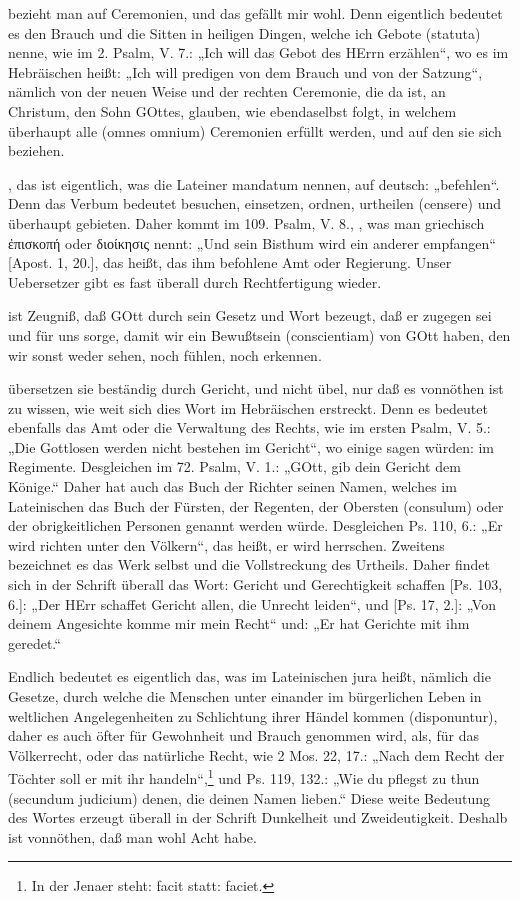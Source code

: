  bezieht man auf Ceremonien, und das gefällt mir wohl. Denn eigentlich bedeutet es den Brauch und die Sitten in heiligen Dingen, welche ich Gebote (statuta) nenne, wie im 2. Psalm, V. 7.: „Ich will das Gebot des HErrn erzählen“, wo es im Hebräischen heißt: „Ich will predigen von dem Brauch und von der Satzung“, nämlich von der neuen Weise und der rechten Ceremonie, die da ist, an Christum, den Sohn GOttes, glauben, wie ebendaselbst folgt, in welchem überhaupt alle (omnes omnium) Ceremonien erfüllt werden, und auf den sie sich beziehen.

, das ist eigentlich, was die Lateiner mandatum nennen, auf deutsch: „befehlen“. Denn das Verbum  bedeutet besuchen, einsetzen, ordnen, urtheilen (censere) und überhaupt gebieten. Daher kommt im 109. Psalm, V. 8., , was man griechisch ἐπισκοπή oder διοίκησις nennt: „Und sein Bisthum wird ein anderer empfangen“ [Apost. 1, 20.], das heißt, das ihm befohlene Amt oder Regierung. Unser Uebersetzer gibt es fast überall durch Rechtfertigung wieder.

 ist Zeugniß, daß GOtt durch sein Gesetz und Wort bezeugt, daß er zugegen sei und für uns sorge, damit wir ein Bewußtsein (conscientiam) von GOtt haben, den wir sonst weder sehen, noch fühlen, noch erkennen.

 übersetzen sie beständig durch Gericht, und nicht übel, nur daß es vonnöthen ist zu wissen, wie weit sich dies Wort im Hebräischen erstreckt. Denn es bedeutet ebenfalls das Amt oder die Verwaltung des Rechts, wie im ersten Psalm, V. 5.: „Die Gottlosen werden nicht bestehen im Gericht“, wo einige sagen würden: im Regimente. Desgleichen im 72. Psalm, V. 1.: „GOtt, gib dein Gericht dem Könige.“ Daher hat auch das Buch der Richter seinen Namen, welches im Lateinischen das Buch der Fürsten, der Regenten, der Obersten (consulum) oder der obrigkeitlichen Personen genannt werden würde. Desgleichen Ps. 110, 6.: „Er wird richten unter den Völkern“, das heißt, er wird herrschen. Zweitens bezeichnet es das Werk selbst und die Vollstreckung des Urtheils. Daher findet sich in der Schrift überall das Wort: Gericht und Gerechtigkeit schaffen [Ps. 103, 6.]: „Der HErr schaffet Gericht allen, die Unrecht leiden“, und [Ps. 17, 2.]: „Von deinem Angesichte komme mir mein Recht“ und: „Er hat Gerichte mit ihm geredet.“

Endlich bedeutet es eigentlich das, was im Lateinischen jura heißt, nämlich die Gesetze, durch welche die Menschen unter einander im bürgerlichen Leben in weltlichen Angelegenheiten zu Schlichtung ihrer Händel kommen (disponuntur), daher es auch öfter für Gewohnheit und Brauch genommen wird, als, für das Völkerrecht, oder das natürliche Recht, wie 2 Mos. 22, 17.: „Nach dem Recht der Töchter soll er mit ihr handeln“,\footnote{In der Jenaer steht: facit statt: faciet.} und Ps. 119, 132.: „Wie du pflegst zu thun (secundum judicium) denen, die deinen Namen lieben.“ Diese weite Bedeutung des Wortes erzeugt überall in der Schrift Dunkelheit und Zweideutigkeit. Deshalb ist vonnöthen, daß man wohl Acht habe.

